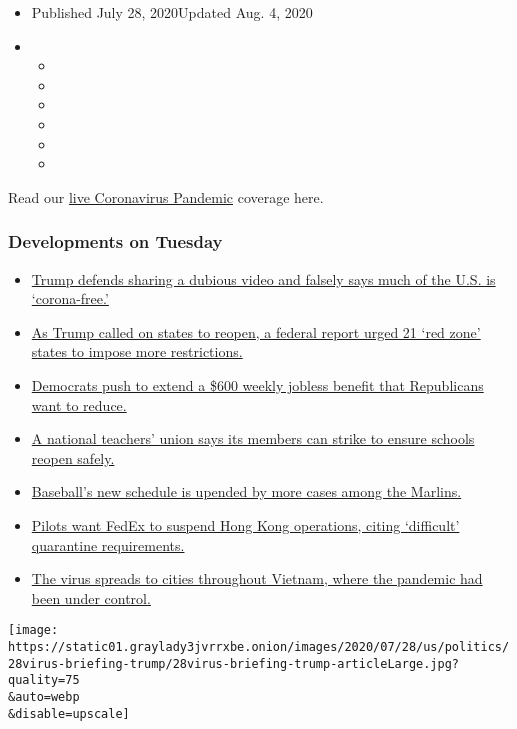 \begin{itemize}
\item
  Published July 28, 2020Updated Aug. 4, 2020
\item
  \begin{itemize}
  \item
  \item
  \item
  \item
  \item
  \item
  \end{itemize}
\end{itemize}

Read our
\href{https://www.nytimes3xbfgragh.onion/2020/08/04/world/coronavirus-cases.html}{live
Coronavirus Pandemic} coverage here.

\hypertarget{developments-on-tuesday}{%
\subsubsection{Developments on Tuesday}\label{developments-on-tuesday}}

\begin{itemize}
\tightlist
\item
  \protect\hyperlink{link-46e7265a}{Trump defends sharing a dubious
  video and falsely says much of the U.S. is `corona-free.'}
\item
  \protect\hyperlink{link-1e0e9a70}{As Trump called on states to reopen,
  a federal report urged 21 `red zone' states to impose more
  restrictions.}
\item
  \protect\hyperlink{link-838c964}{Democrats push to extend a \$600
  weekly jobless benefit that Republicans want to reduce.}
\item
  \protect\hyperlink{link-541bdc40}{A national teachers' union says its
  members can strike to ensure schools reopen safely.}
\item
  \protect\hyperlink{link-2197dc2d}{Baseball's new schedule is upended
  by more cases among the Marlins.}
\item
  \protect\hyperlink{link-7674b55b}{Pilots want FedEx to suspend Hong
  Kong operations, citing `difficult' quarantine requirements.}
\item
  \protect\hyperlink{link-798ed6c2}{The virus spreads to cities
  throughout Vietnam, where the pandemic had been under control.}
\end{itemize}

\texttt{[image: https://static01.graylady3jvrrxbe.onion/images/2020/07/28/us/politics/28virus-briefing-trump/28virus-briefing-trump-articleLarge.jpg?quality=75\\\&auto=webp\\\&disable=upscale]}

